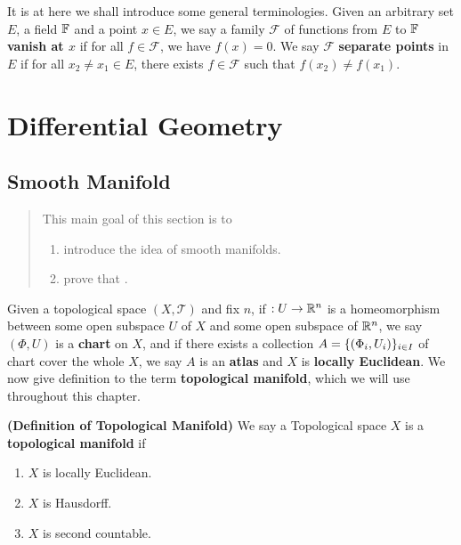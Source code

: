\documentclass{report}
\begin{document}
\begin{mdframed}
It is at here we shall introduce some general terminologies. Given an arbitrary set $E$, a field  $\mathbb{F}$ and a point $x \in E$, we say a family $\mathcal{F}$ of functions  from $E$ to  $\mathbb{F}$  \textbf{vanish at $x$} if for all $f \in \mathcal{F}$, we have $f(x)=0$. We say $\mathcal{F}$ \textbf{separate points} in $E$ if for all  $x_2\neq x_1 \in E$, there exists $f\in \mathcal{F}$ such that $f(x_2)\neq f(x_1)$. 
\end{mdframed}
\chapter{Differential Geometry}
\label{Differentail Geometry}
\section{Smooth Manifold}
\begin{abstract}
This main goal of this section is to 
\begin{enumerate}[label=(\alph*)]
  \item introduce the idea of smooth manifolds. 
  \item prove that . 
\end{enumerate}
\end{abstract}
\begin{mdframed}
Given a topological space $(X,\mathscr{T })$ and fix $n$, if $:U\rightarrow \mathbb{R}^n$ is a homeomorphism between some open subspace $U$ of $X$ and some open subspace of $\mathbb{R}^n$, we say $(\Phi,U)$ is a \textbf{chart} on $X$, and if there exists a collection $A=\{ (\Phi_i, U_i) \}_{i \in I}$ of chart cover the whole $X$, we say $A$ is an  \textbf{atlas} and  $X$ is  \textbf{locally Euclidean}.  We now give definition to the term \textbf{topological manifold}, which we will use throughout this chapter.  
\end{mdframed}
\begin{definition}
\textbf{(Definition of Topological Manifold)} We say a Topological space $X$ is a \textbf{topological manifold} if 
\begin{enumerate}[label=(\alph*)]
  \item $X$ is locally Euclidean. 
  \item $X$ is Hausdorff. 
  \item $X$ is second countable.
\end{enumerate}
\end{definition}
\end{document}
